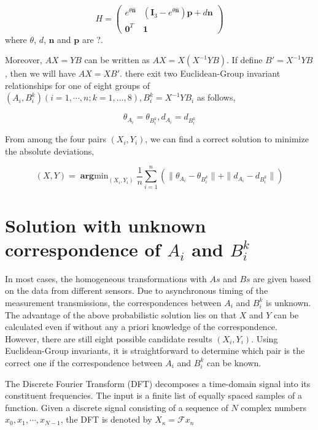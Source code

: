 \documentclass[letterpaper, 10 pt, conference]{ieeeconf}  %
\begin{document}
\begin{equation}\label{equ21}
H = \left( \begin{array}{cc}
       e^{\theta \hat{\mathbf{n}}} & (\mathbf{I}_{3} - e^{\theta \hat{\mathbf{n}}})\mathbf{p} + d\mathbf{n} \\
       \mathbf{0}^{T} & \mathbf{1}
\end{array} \right)
\end{equation}
where $\theta$, $d$, $\mathbf{n}$ and $\mathbf{p}$ are ?.

Moreover, $AX=YB$ can be written as $AX=X(X^{-1}YB)$. If define $B' = X^{-1}YB$, then we will have $AX=XB'$. there exit two Euclidean-Group invariant relationships for one of eight groups of $(A_{i},B_{i}^k)( i = 1,\cdots,n; k=1,\dots,8), B_i^{k} = X^{-1}YB_i$ as follows,

\begin{equation}\label{equ22}
    \theta_{A_{i}}=\theta_{B_{i}^{k}}, d_{A_{i}}=d_{B_{i}^{k}}
\end{equation}

From among the four pairs $(X_{i},Y_{i})$, we can find a correct solution to minimize the absolute deviations,

\begin{equation}\label{equ23}
    (X,Y) = \mathop{\mathbf{arg}min}_{(X_{i},Y_{i})}\frac{1}{n} \sum_{i=1}^{n} (\parallel \theta_{A_{i}}-\theta_{B_{i}^{k}} \parallel + \parallel d_{A_{i}}-d_{B_{i}^{k}} \parallel)
\end{equation}

\section{Solution with unknown correspondence of $A_{i}$ and $B_{i}^{k}$}
\label{sect3}

In most cases, the homogeneous transformations with $As$ and $Bs$ are given based on the data from different sensors. Due to asynchronous timing of the measurement transmissions, the correspondences between $A_{i}$ and $B_{i}^{k}$ is unknown. The advantage of the above probabilistic solution lies on that $X$ and $Y$ can be calculated even if without any a priori knowledge of the correspondence. However, there are still eight possible candidate results $(X_{i},Y_{i})$. Using Euclidean-Group invariants, it is straightforward to determine which pair is the correct one if the correspondence between $A_{i}$ and $B_{i}^{k}$ can be known.

The Discrete Fourier Transform (DFT) decomposes a time-domain signal into its constituent frequencies. The input is a finite list of equally spaced samples of a function. Given a discrete signal consisting of a sequence of $N$ complex numbers $x_{0},x_{1},\cdots,x_{N-1}$, the DFT is denoted by $X_{\kappa} = \mathcal{F}{x_{n}}$
\end{document}
